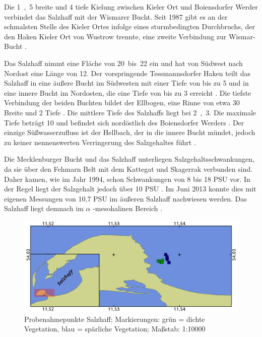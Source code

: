 Die \unit{1,5}{\kilo\metre} breite und \unit{4}{\metre} tiefe Kielung zwischen Kieler Ort und Boiensdorfer Werder verbindet das Salzhaff mit der Wismarer Bucht. Seit 1987 gibt es an der schmalsten Stelle des Kieler Ortes infolge eines sturmbedingten Durchbruchs, der den Haken Kieler Ort von Wustrow trennte, eine zweite Verbindung zur Wismar-Bucht \citep{kohn_1991}.

Das Salzhaff nimmt eine Fläche von \unit{20 bis 22}{\kilo\metre\squared} ein und hat von Südwest nach Nordost eine Länge von \unit{12}{\kilo\metre}. Der vorspringende Tessmannsdorfer Haken teilt das Salzhaff in eine äußere Bucht im Südwesten mit einer Tiefe von bis zu \unit{5}{\metre} und in eine innere Bucht im Nordosten, die eine Tiefe von bis zu \unit{3}{\metre} erreicht \citep{weber_1997}. Die tiefste Verbindung der beiden Buchten bildet der Ellbogen, eine Rinne von etwa \unit{30}{\metre} Breite und \unit{2}{\metre} Tiefe \citep{kohn_1991}.
Die mittlere Tiefe des Salzhaffs liegt bei \unit{2,3}{\metre}. Die maximale Tiefe beträgt \unit{10}{\metre} und befindet sich nordöstlich des Boiensdorfer Werders \citep{kohn_1991}.
Der einzige Süßwasserzufluss ist der Hellbach, der in die innere Bucht mündet, jedoch zu keiner nennenswerten Verringerung des Salzgehaltes führt \citep{weber_1997}. 

Die Mecklenburger Bucht und das Salzhaff unterliegen Salzgehaltsschwankungen, da sie über den Fehmarn Belt mit dem Kattegat und Skagerrak verbunden sind. Daher kamen, wie im Jahr 1994, schon Schwankungen von 8 bis 18 PSU vor. In der Regel liegt der Salzgehalt jedoch über 10 PSU \citep{weber_1997}. Im Juni 2013 konnte dies mit eigenen Messungen von 10,7 PSU im äußeren Salzhaff nachwiesen werden. Das Salzhaff liegt demnach im $ \alpha$ -mesohalinen Bereich \citep{gosselck_2011}. 




\begin{figure}[htb]
\centering
\includegraphics[width=1\textwidth]{images/SH}
\caption[Probenahmepunkte Salzhaff]{Probenahmepunkte Salzhaff; Markierungen: grün = dichte Vegetation, blau = spärliche Vegetation; Maßstab: 1:10000}
\label{SH}
\end{figure}



